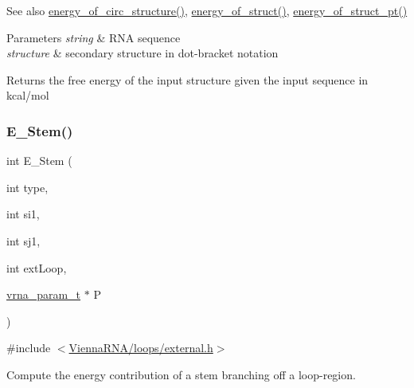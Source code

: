 \begin{DoxySeeAlso}{See also}
\hyperlink{group__eval__deprecated_gaeb14f3664aec67fc03268ac75253f0f8}{energy\+\_\+of\+\_\+circ\+\_\+structure()}, \hyperlink{group__eval__deprecated_gac2b37fea2145c94d925a3f33378ef87b}{energy\+\_\+of\+\_\+struct()}, \hyperlink{group__eval__deprecated_ga27ce6f68512d43bf1fe14a06c9d76d5c}{energy\+\_\+of\+\_\+struct\+\_\+pt()} 
\end{DoxySeeAlso}

\begin{DoxyParams}{Parameters}
{\em string} & R\+NA sequence \\
\hline
{\em structure} & secondary structure in dot-\/bracket notation \\
\hline
\end{DoxyParams}
\begin{DoxyReturn}{Returns}
the free energy of the input structure given the input sequence in kcal/mol 
\end{DoxyReturn}
\mbox{\label{group__eval__deprecated_ga51f9851f3500c2aae66674142a6a2dd5}} 
\subsubsection{\texorpdfstring{E\+\_\+\+Stem()}{E\_Stem()}}
{\footnotesize\ttfamily int E\+\_\+\+Stem (\begin{DoxyParamCaption}\item[{int}]{type,  }\item[{int}]{si1,  }\item[{int}]{sj1,  }\item[{int}]{ext\+Loop,  }\item[{\hyperlink{group__energy__parameters_ga8a69ca7d787e4fd6079914f5343a1f35}{vrna\+\_\+param\+\_\+t} $\ast$}]{P }\end{DoxyParamCaption})}



{\ttfamily \#include $<$\hyperlink{external_8h}{Vienna\+R\+N\+A/loops/external.\+h}$>$}



Compute the energy contribution of a stem branching off a loop-\/region. 

